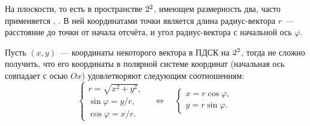\begin{wrapfigure}{r}{0.27\tw}
    \centering
    \vspace{-1pc}
    \caption{}
    \label{pic:math-coord-sys-polar}
\end{wrapfigure}
На плоскости, то есть в пространстве $2^2$, имеющем размерность два, часто применяется , . В ней координатами точки является длина радиус-вектора $r$~--- расстояние до точки от начала отсчёта, и угол радиус-вектора с начальной ось $\varphi$.

Пусть $(x,y)$~--- координаты некоторого вектора в ПДСК на $2^2$, тогда не сложно получить, что его координаты в полярной системе координат (начальная ось совпадает с осью $Ox$)  удовлетворяют следующим соотношениям:
\begin{equation}
    \begin{cases}
        r = \sqrt{x^2 + y^2},\\
        \sin \varphi = y/r,\\
        \cos \varphi = x/r.
    \end{cases}
    \quad \Leftrightarrow \quad
    \begin{cases}
        x = r \cos \varphi,\\
        y = r \sin \varphi.
    \end{cases}
\end{equation}

